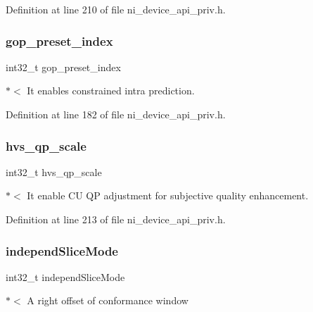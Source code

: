 Definition at line 210 of file ni\+\_\+device\+\_\+api\+\_\+priv.\+h.

\mbox{\label{struct__ni__t408__config__t_ab0b73cbef66b6ba4166889a36bb20d4a}} 
\subsubsection{\texorpdfstring{gop\_preset\_index}{gop\_preset\_index}}
{\footnotesize\ttfamily int32\+\_\+t gop\+\_\+preset\+\_\+index}

$\ast$$<$ It enables constrained intra prediction. 

Definition at line 182 of file ni\+\_\+device\+\_\+api\+\_\+priv.\+h.

\mbox{\label{struct__ni__t408__config__t_a821d5b82e11f8ba2e7fee3cbea45ae70}} 
\subsubsection{\texorpdfstring{hvs\_qp\_scale}{hvs\_qp\_scale}}
{\footnotesize\ttfamily int32\+\_\+t hvs\+\_\+qp\+\_\+scale}

$\ast$$<$ It enable CU QP adjustment for subjective quality enhancement. 

Definition at line 213 of file ni\+\_\+device\+\_\+api\+\_\+priv.\+h.

\mbox{\label{struct__ni__t408__config__t_a30a01a8c46d70e118ff75abc8b5e3014}} 
\subsubsection{\texorpdfstring{independSliceMode}{independSliceMode}}
{\footnotesize\ttfamily int32\+\_\+t independ\+Slice\+Mode}

$\ast$$<$ A right offset of conformance window 

